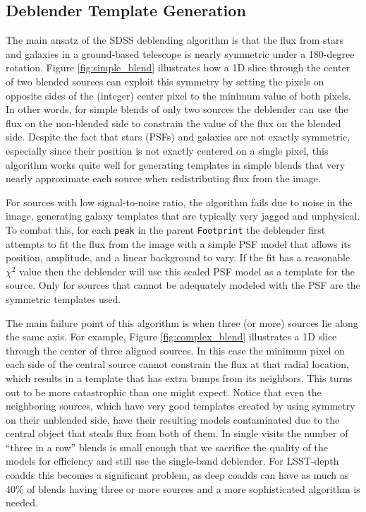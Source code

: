 \subsection{Deblender Template Generation}

The main ansatz of the SDSS deblending algorithm is that the flux from stars and galaxies in a ground-based telescope is nearly symmetric under a 180-degree rotation.
Figure \ref{fig:simple_blend} illustrates how a 1D slice through the center of two blended sources can exploit this symmetry by setting the pixels on opposite sides of the (integer) center pixel to the minimum value of both pixels.
In other words, for simple blends of only two sources the deblender can use the flux on the non-blended side to constrain the value of the flux on the blended side.
Despite the fact that stars (PSFs) and galaxies are not exactly symmetric, especially since their position is not exactly centered on a single pixel, this algorithm works quite well for generating templates in simple blends that very nearly approximate each source when redistributing flux from the image.

For sources with low signal-to-noise ratio, the algorithm fails due to noise in the image, generating galaxy templates that are typically very jagged and unphysical.
To combat this, for each \texttt{peak} in the parent \texttt{Footprint} the deblender first attempts to fit the flux from the image with a simple PSF model that allows its position, amplitude, and a linear background to vary.
If the fit has a reasonable $\chi^2$ value then the deblender will use this scaled PSF model as a template for the source.
Only for sources that cannot be adequately modeled with the PSF are the symmetric templates used.

The main failure point of this algorithm is when three (or more) sources lie along the same axis.
For example, Figure \ref{fig:complex_blend} illustrates a 1D slice through the center of three aligned sources.
In this case the minimum pixel on each side of the central source cannot constrain the flux at that radial location, which results in a template that has extra bumps from its neighbors.
This turns out to be more catastrophic than one might expect.
Notice that even the neighboring sources, which have very good templates created by using symmetry on their unblended side, have their resulting models contaminated due to the central object that steals flux from both of them.
In single visits the number of ``three in a row'' blends is small enough that we sacrifice the quality of the models for efficiency and still use the single-band deblender.
For LSST-depth coadds this becomes a significant problem, as deep coadds can have as much as 40\% of blends having three or more sources and a more sophisticated algorithm is needed.

